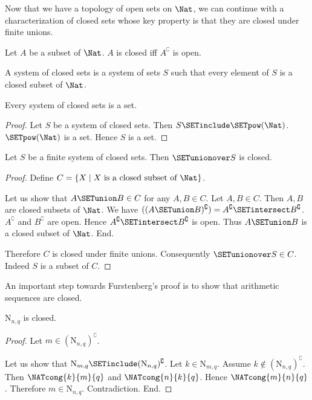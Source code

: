 \documentclass{article}
\newcommand{\N}{\mathrm{N}}
\begin{document}
  Now that we have a topology of open sets on $\Nat$, we can continue
  with a characterization of closed sets whose key property is that they are
  closed under finite unions.

  \begin{forthel}
    \begin{definition}
      Let $A$ be a subset of $\Nat$.
      $A$ is closed iff $A^\complement$ is open.
    \end{definition}

    \begin{definition}
      A system of closed sets is a system of sets $S$ such that every element of
      $S$ is a closed subset of $\Nat$.
    \end{definition}

    \begin{lemma}
      Every system of closed sets is a set.
    \end{lemma}
    \begin{proof}
      Let $S$ be a system of closed sets.
      Then $S \SETinclude \SETpow(\Nat)$.
      $\SETpow(\Nat)$ is a set.
      Hence $S$ is a set.
    \end{proof}

    \begin{lemma}
      Let $S$ be a finite system of closed sets.
      Then $\SETunionover S$ is closed.
    \end{lemma}
    \begin{proof}
      Define $C = \{ X \mid X \text{ is a closed subset of } \Nat \}$.

      Let us show that $A \SETunion B \in C$ for any $A, B \in C$.
        Let $A, B \in C$.
        Then $A, B$ are closed subsets of $\Nat$.
        We have $((A \SETunion B)^\complement) = A^\complement \SETintersect B^\complement$. %
        $A^\complement$ and $B^\complement$ are open.
        Hence $A^\complement \SETintersect B^\complement$ is open.
        Thus $A \SETunion B$ is a closed subset of $\Nat$.
      End.

      Therefore $C$ is closed under finite unions.
      Consequently $\SETunionover S \in C$.
      Indeed $S$ is a subset of $C$.
    \end{proof}
  \end{forthel}

  An important step towards Furstenberg's proof is to show that arithmetic
  sequences are closed.

  \begin{forthel}
    \begin{lemma}
      $\N_{n, q}$ is closed.
    \end{lemma}
    \begin{proof}
      Let $m \in (\N_{n, q})^\complement$.

      Let us show that $\N_{m, q} \SETinclude (\N_{n, q})^\complement$.
        Let $k \in \N_{m, q}$.
        Assume $k \notin (\N_{n, q})^\complement$.
        Then $\NATcong{k}{m}{q}$ and $\NATcong{n}{k}{q}$.
        Hence $\NATcong{m}{n}{q}$.
        Therefore $m \in \N_{n, q}$.
        Contradiction.
      End.
    \end{proof}
  \end{forthel}
\end{document}
